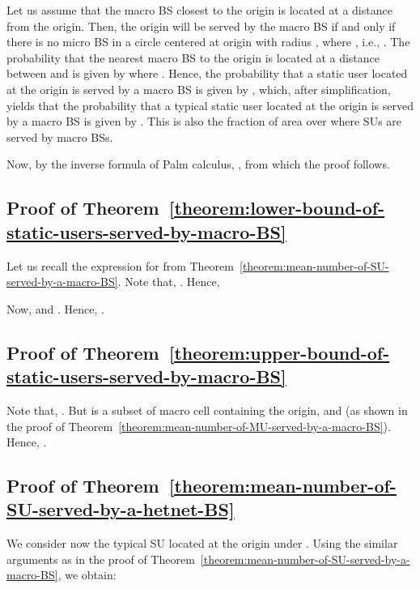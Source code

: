 \documentclass[10pt,journal]{IEEEtran}
\begin{document}
Let us assume that the macro BS closest to the origin is located at a distance  from the origin. Then, the origin will be served by the macro BS 
if and only if there is no micro BS in a circle centered at origin with radius , where , 
i.e., . The probability that the nearest macro BS to the origin is located at a distance between 
 and  is given by  where . 
Hence, the probability that a static user located at the origin is served by a macro BS is given by 
, which, after simplification, yields 
that the probability that a typical static user 
located at the origin is served by a macro BS is given by 
 . This is also the fraction of area over 
  where SUs are served by macro BSs. 
 
 Now, by the inverse formula of Palm calculus, 
 , 
 from which the proof  follows.




\subsection{Proof of Theorem~\ref{theorem:lower-bound-of-static-users-served-by-macro-BS}}
\label{subsection:lower-bound-of-static-users-served-by-macro-BS}
Let us recall the expression for  from Theorem~\ref{theorem:mean-number-of-SU-served-by-a-macro-BS}. 
Note that, . Hence, 


Now,  
and . 
Hence, . 


\subsection{Proof of Theorem~\ref{theorem:upper-bound-of-static-users-served-by-macro-BS}}
\label{subsection:proof-of-upper-bound-of-static-users-served-by-macro-BS}
Note that, . But  is a subset 
of macro cell  containing the origin, and  
(as shown in the proof of Theorem~\ref{theorem:mean-number-of-MU-served-by-a-macro-BS}). 
Hence, .




\subsection{Proof of Theorem~\ref{theorem:mean-number-of-SU-served-by-a-hetnet-BS}}
 \label{subsection:proof-of-mean-number-of-SU-served-by-a-hetnet-BS}
We consider now the typical SU located at the origin under . Using the similar arguments as 
in the proof of Theorem~\ref{theorem:mean-number-of-SU-served-by-a-macro-BS}, we obtain:
\end{document}
